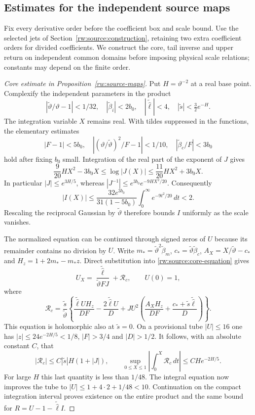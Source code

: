 \subsection{Estimates for the independent source maps}
\label{rw:app:source-estimates}

Fix every derivative order before the coefficient box and scale bound.
Use the selected jets of Section~\ref{rw:source:construction}, retaining
two extra coefficient orders for divided coefficients. We construct the
core, tail inverse and upper return on independent common domains before
imposing physical scale relations; constants may depend on the finite
order.

\begin{proof}[Core estimate in Proposition~\ref{rw:source-maps}]
Put $H=\vartheta^{-2}$ at a real base point. Complexify the independent
parameters in the product
\[
 |\widetilde\vartheta/\vartheta-1|<1/32,\quad
 |\widetilde\beta_i|<2b_0,\quad |\widetilde{\widehat\ell}|<4,
 \quad |\widetilde s|<\tfrac32e^{-H}.
\]
The integration variable $X$ remains real. With tildes suppressed in
the functions, the elementary estimates
\[
 |F-1|<5b_0,\quad
 |(\vartheta/\widetilde\vartheta)^2/F-1|<1/10,
 \quad |\widetilde\beta_c/F|<3b_0
\]
hold after fixing $b_0$ small. Integration of the real part of the
exponent of $J$ gives
\begin{equation}\label{rw:app:source-Gaussian}
 \frac9{20}HX^2-3b_0X\le\log|J(X)|
            \le\frac{11}{20}HX^2+3b_0X.
\end{equation}
In particular $|J|\le e^{3H/5}$, whereas
$|J^{-1}|\le e^{3b_0}e^{-9HX^2/20}$. Consequently
\[
 |I(X)|\le\frac{32e^{3b_0}}{31(1-5b_0)}
                    \int_0^\infty e^{-9t^2/20}\,dt<2.
\]
Rescaling the reciprocal Gaussian by $\widetilde\vartheta$ therefore
bounds $I$ uniformly as the scale vanishes.

The normalized equation can be continued through signed zeros of $U$
because its remainder contains no division by $U$. Write
$m_* =\widetilde\vartheta^2\widetilde\beta_m$,
$c_* =\widetilde\vartheta\widetilde\beta_c$,
$A_X=X/\widetilde\vartheta-c_*$ and $H_z=1+2m_*-m_*z$.
Direct substitution into \eqref{rw:source:core-equation} gives
\[
 U_X=\frac{\widetilde{\widehat\ell}}{\widetilde\vartheta FJ}
       +\mathcal R_c,\qquad U(0)=1,
\]
where
\[
 \mathcal R_c=\frac{\widetilde s}{\widetilde\vartheta}
 \left\{\frac{\widetilde{\widehat\ell} UH_z}{DF}
 -\frac{2\widetilde{\widehat\ell} U}{D}
 +JU^2\left(\frac{A_XH_z}{DF}
                    +\frac{c_*+\widetilde s\widetilde{\widehat\ell}}{D}\right)
 \right\}.
\]
This equation is holomorphic also at $\widetilde s=0$. On a
provisional tube $|U|\le16$ one has
$|z|\le24e^{-2H/5}<1/8$, $|F|>3/4$ and $|D|>1/2$.
It follows, with an absolute constant $C$, that
\[
 |\mathcal R_c|\le C|\widetilde s|H(1+|J|),\qquad
 \sup_{0\le X\le1}\left|\int_0^X\mathcal R_c\,dt\right|
                              \le CH e^{-2H/5}.
\]
For large $H$ this last quantity is less than $1/48$.
The integral equation now improves the tube to
$|U|\le1+4\cdot2+1/48<10$. Continuation on the compact
integration interval proves existence on the entire product and the
same bound for $R=U-1-\widetilde{\widehat\ell} I$.


\end{proof}
